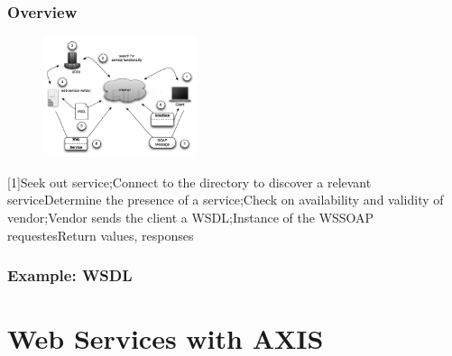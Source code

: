 \documentclass{beamer}
\begin{document}
\begin{frame}
\frametitle{Overview}

\begin{figure}
\includegraphics[width=170]{../pics/overview.png}
\label{overflow}
\end{figure}

{\scriptsize
[1]Seek out service;\newline
[2]Connect to the directory to discover a relevant service\newline 
[3]Determine the presence of a service;\newline 
[4]Check on availability and validity of vendor;\newline
[5]Vendor sends the client a WSDL;\newline
[6]Instance of the WS\newline
[7]SOAP requestes\newline
[8]Return values, responses
}

\end{frame}

\begin{frame}
\frametitle{Example: WSDL} 

\end{frame}



\section{Web Services with AXIS}
\end{document}
